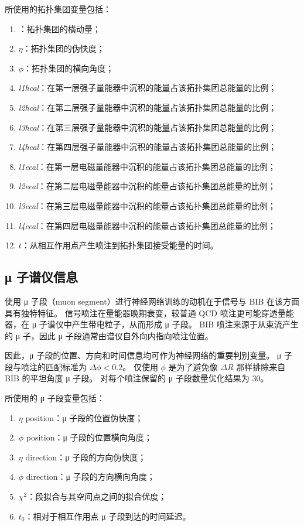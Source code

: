 所使用的拓扑集团变量包括：
\begin{enumerate}
      \item \pt：拓扑集团的横动量；
      \item $\eta$：拓扑集团的伪快度；
      \item $\phi$：拓扑集团的横向角度；
      \item \textit{l1hcal}：在第一层强子量能器中沉积的能量占该拓扑集团总能量的比例；
      \item \textit{l2hcal}：在第二层强子量能器中沉积的能量占该拓扑集团总能量的比例；
      \item \textit{l3hcal}：在第三层强子量能器中沉积的能量占该拓扑集团总能量的比例；
      \item \textit{l4hcal}：在第四层强子量能器中沉积的能量占该拓扑集团总能量的比例；
      \item \textit{l1ecal}：在第一层电磁量能器中沉积的能量占该拓扑集团总能量的比例；
      \item \textit{l2ecal}：在第二层电磁量能器中沉积的能量占该拓扑集团总能量的比例；
      \item \textit{l3ecal}：在第三层电磁量能器中沉积的能量占该拓扑集团总能量的比例；
      \item \textit{l4ecal}：在第四层电磁量能器中沉积的能量占该拓扑集团总能量的比例；
      \item $t$：从相互作用点产生喷注到拓扑集团接受能量的时间。
\end{enumerate}

\subsection{μ 子谱仪信息}
使用 μ 子段（muon segment）进行神经网络训练的动机在于信号与 BIB 在该方面具有独特特征。
信号喷注在量能器晚期衰变，较普通 QCD 喷注更可能穿透量能器，在 μ 子谱仪中产生带电粒子，从而形成 μ 子段。
BIB 喷注来源于从束流产生的 μ 子，因此 μ 子段通常由谱仪自外向内指向喷注位置。

因此，μ 子段的位置、方向和时间信息均可作为神经网络的重要判别变量。
μ 子段与喷注的匹配标准为 $\Delta \phi < 0.2$。
仅使用 $\phi$ 是为了避免像 $\Delta R$ 那样排除来自 BIB 的平坦角度 μ 子段。
对每个喷注保留的 μ 子段数量优化结果为 30。

所使用的 μ 子段变量包括：
\begin{enumerate}
      \item $\eta$ position：μ 子段的位置伪快度；
      \item $\phi$ position：μ 子段的位置横向角度；
      \item $\eta$ direction：μ 子段的方向伪快度；
      \item $\phi$ direction：μ 子段的方向横向角度；
      \item $\chi^2$：段拟合与其空间点之间的拟合优度；
      \item $t_0$：相对于相互作用点 μ 子段到达的时间延迟。
\end{enumerate}

